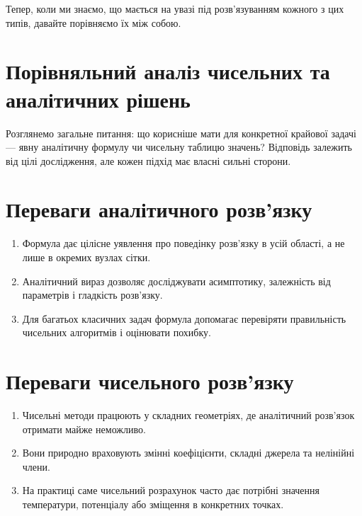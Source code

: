 \documentclass[
  ukrainian,
]{article}
\providecommand{\tightlist}{%
  \setlength{\itemsep}{0pt}\setlength{\parskip}{0pt}}
\begin{document}
Тепер, коли ми знаємо, що мається на увазі під розв'язуванням кожного з
цих типів, давайте порівняємо їх між собою.

\section{\texorpdfstring{\textbf{Порівняльний аналіз чисельних} та
аналітичних
рішень}{Порівняльний аналіз чисельних та аналітичних рішень}}\label{ux43fux43eux440ux456ux432ux43dux44fux43bux44cux43dux438ux439-ux430ux43dux430ux43bux456ux437-ux447ux438ux441ux435ux43bux44cux43dux438ux445-ux442ux430-ux430ux43dux430ux43bux456ux442ux438ux447ux43dux438ux445-ux440ux456ux448ux435ux43dux44c}

Розглянемо загальне питання: що корисніше мати для конкретної крайової
задачі --- явну аналітичну формулу чи чисельну таблицю значень?
Відповідь залежить від цілі дослідження, але кожен підхід має власні
сильні сторони.

\section{Переваги аналітичного
розв'язку}\label{ux43fux435ux440ux435ux432ux430ux433ux438-ux430ux43dux430ux43bux456ux442ux438ux447ux43dux43eux433ux43e-ux440ux43eux437ux432ux44fux437ux43aux443}

\begin{enumerate}
\def\labelenumi{\arabic{enumi}.}
\tightlist
\item
  Формула дає цілісне уявлення про поведінку розв'язку в усій області, а
  не лише в окремих вузлах сітки.
\item
  Аналітичний вираз дозволяє досліджувати асимптотику, залежність від
  параметрів і гладкість розв'язку.
\item
  Для багатьох класичних задач формула допомагає перевіряти правильність
  чисельних алгоритмів і оцінювати похибку.
\end{enumerate}

\section{Переваги чисельного
розв'язку}\label{ux43fux435ux440ux435ux432ux430ux433ux438-ux447ux438ux441ux435ux43bux44cux43dux43eux433ux43e-ux440ux43eux437ux432ux44fux437ux43aux443}

\begin{enumerate}
\def\labelenumi{\arabic{enumi}.}
\tightlist
\item
  Чисельні методи працюють у складних геометріях, де аналітичний
  розв'язок отримати майже неможливо.
\item
  Вони природно враховують змінні коефіцієнти, складні джерела та
  нелінійні члени.
\item
  На практиці саме чисельний розрахунок часто дає потрібні значення
  температури, потенціалу або зміщення в конкретних точках.
\end{enumerate}
\end{document}
